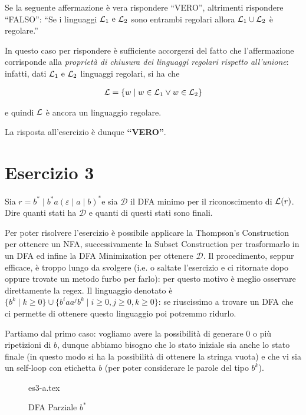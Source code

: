 \documentclass[class=book, crop=false, oneside, 12pt]{standalone}
\begin{document}
Se la seguente affermazione è vera rispondere “VERO”, altrimenti rispondere “FALSO”: “Se i linguaggi \(\mathcal{L}_1 \textrm{ e } \mathcal{L}_2\) sono entrambi regolari allora \(\mathcal{L}_1 \cup \mathcal{L}_2\) è regolare.”

In questo caso per rispondere è sufficiente accorgersi del fatto che l'affermazione corrisponde alla \emph{proprietà di chiusura dei linguaggi regolari rispetto all'unione}: infatti, dati \(\mathcal{L}_1 \textrm{ e } \mathcal{L}_2\) linguaggi regolari, si ha che 

\begin{align*}
    \mathcal{L} = \{w \mid w \in \mathcal{L}_1 \lor w \in \mathcal{L}_2\}
\end{align*}

e quindi \(\mathcal{L}\) è ancora un linguaggio regolare. 

La risposta all'esercizio è dunque \textbf{“VERO”}.

\section*{Esercizio 3}

Sia \(r=b^* \mid b^* a (\varepsilon \mid a \mid b)^*\)e sia \(\mathcal{D}\) il DFA minimo per il riconoscimento di \(\mathcal{L}(r)\). Dire quanti stati ha \(\mathcal{D}\) e quanti di questi stati sono finali.

Per poter risolvere l'esercizio è possibile applicare la Thompson's Construction per ottenere un NFA, successivamente la Subset Construction per trasformarlo in un DFA ed infine la DFA Minimization per ottenere \(\mathcal{D}\). Il procedimento, seppur efficace, è troppo lungo da svolgere (i.e. o saltate l'esercizio e ci ritornate dopo oppure trovate un metodo furbo per farlo): per questo motivo è meglio osservare direttamente la regex. Il linguaggio denotato è \(\{b^k \mid k \geq 0\} \cup \{b^i a a^j b^k \mid i \geq 0, j \geq 0, k \geq 0\}\): se riuscissimo a trovare un DFA che ci permette di ottenere questo linguaggio poi potremmo ridurlo. 

Partiamo dal primo caso: vogliamo avere la possibilità di generare 0 o più ripetizioni di \(b\), dunque abbiamo bisogno che lo stato iniziale sia anche lo stato finale (in questo modo si ha la possibilità di ottenere la stringa vuota) e che vi sia un self-loop con etichetta \(b\) (per poter considerare le parole del tipo \(b^k\)).

\begin{figure}[H]
	\centering
    {es3-a.tex}
    \caption{DFA Parziale \(b^*\)}
    \label{fig:dfa-pt1-ex3}
\end{figure}
\end{document}
